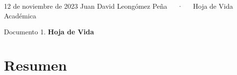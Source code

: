 \documentclass[11pt,a4paper,]{awesome-cv}
\begin{document}
\makecvheader

\makecvfooter
  {12 de noviembre de 2023}
    {Juan David Leongómez Peña~~~·~~~Hoja de Vida Académica}
  {\thepage}





\vspace{4mm}
\begin{tcolorbox}[enhanced,
        on line, 
        boxsep=4pt, left=0pt,right=0pt,top=0pt,bottom=0pt,
        colframe=white,colback=black]
  
\color{white}
\begin{LARGE}\begin{center}
Documento 1. \textbf{Hoja de Vida}
\end{center}\end{LARGE}
\end{tcolorbox}

\hypertarget{resumen}{%
\section{Resumen}\label{resumen}}
\end{document}
